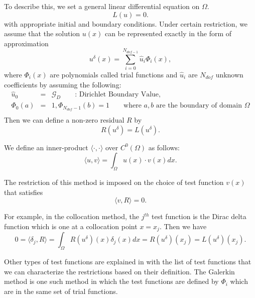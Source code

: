 To describe this, we set a general linear differential equation on $\Omega$.
\begin{equation}
\label{pde1} L(u) = 0.
\end{equation}
with appropriate initial and boundary conditions. Under certain restriction, we assume that the solution $u(x)$ can be represented exactly in the form of approximation
\begin{equation}
\label{sol1} u^{\delta}(x) = \sum_{i=0}^{N_{dof-1}} \hat u_i \Phi_i(x),
\end{equation}
where $\Phi_i(x)$ are polynomials called trial functions and $\hat u_i$ are $N_{dof}$ unknown coefficients by assuming the following:
\begin{eqnarray}
    \hat u_0  &=& \mathcal{G}_{D} \qquad \mbox{: Dirichlet Boundary Value}, \\
    \Phi_0(a) &=& 1,  \Phi_{N_{dof}-1}(b) = 1 \qquad \mbox{where $a, b$ are the boundary of domain $\Omega$}\\
\end{eqnarray}
Then we can define a non-zero residual $R$ by
\begin{equation}
R(u^{\delta}) = L(u^{\delta}).
\end{equation}

We define an inner-product $\langle \cdot, \cdot \rangle$ over $C^0(\Omega)$  as follows:
\begin{equation}
\label{functional}
\langle u, v \rangle = \int_{\Omega} u(x) \cdot v(x) dx.
\end{equation}

The restriction of this method is imposed on the choice of test function $v(x)$ that satisfies
\begin{equation}
\langle v, R \rangle = 0.
\end{equation}

For example, in the collocation method, the $j^{th}$ test function is the Dirac delta function which is one at a collocation point $x = x_j$. Then we have
\begin{equation}
0 = \langle \delta_j, R \rangle = \int_{\Omega} R(u^{\delta})(x)\delta_j(x)dx = R(u^{\delta})(x_j) = L(u^{\delta})(x_j).
\end{equation}

Other types of test functions are explained in \cite{Karniadarkis} with the list of test functions that we can characterize the restrictions based on their definition. The Galerkin method is one such method in which the test functions are defined by $\Phi_i$ which are in the same set of trial functions.

